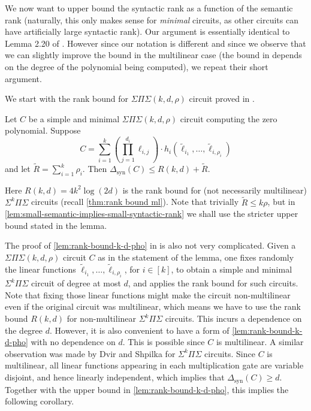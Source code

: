 \documentclass[12pt]{article}
\newcommand{\SumProdSum}{\Sigma \Pi \Sigma}
\newcommand{\Sps}[1]{\Sigma^{#1} \Pi\Sigma}
\newcommand{\ranksyn}{\Delta_{\text{syn}}}
\begin{document}
		
	
	We now want to upper bound the syntactic rank as a function of the semantic rank (naturally, this only makes sense for \emph{minimal} circuits, as other circuits can have artificially large syntactic rank). Our argument is essentially identical to Lemma 2.20 of \cite{KarninShpilka09}. However since our notation is different and since we observe that we can slightly improve the bound in the multilinear case (the bound in \cite{KarninShpilka09} depends on the degree of the polynomial being computed), we repeat their short argument.
	
	We start with the rank bound for $\SumProdSum(k,d,\rho)$ circuit proved in \cite{KarninShpilka08}.
	
	\begin{lemma}
		\label{lem:rank-bound-k-d-pho}
		Let $C$ be a simple and minimal $\SumProdSum(k,d,\rho)$ circuit computing the zero polynomial. Suppose
		\[
		C = \sum_{i=1}^k \left( \prod_{j=1}^{d_i} \ell_{i,j} \right) \cdot h_i (\tilde{\ell}_{i_1}, \ldots, \tilde{\ell}_{i,\rho_i})
		\]
		and let $\tilde{R} = \sum_{i=1}^k \rho_i$.
		Then $\ranksyn(C) \le R(k,d) + \tilde{R}$.
	\end{lemma}
	
	Here $R(k,d) = 4k^2 \log (2d)$ is the rank bound for (not necessarily multilinear) $\Sps{k}$ circuits (recall \autoref{thm:rank bound ml}). Note that trivially $\tilde{R} \le k \rho$, but in \autoref{lem:small-semantic-implies-small-syntactic-rank} we shall use the stricter upper bound stated in the lemma. 
	
	
	The proof of \autoref{lem:rank-bound-k-d-pho} in \cite{KarninShpilka08} is also not very complicated. Given a $\SumProdSum(k,d,\rho)$  circuit $C$ as in the statement of the lemma, one fixes randomly the linear functions $\tilde{\ell}_{i_1}, \ldots, \tilde{\ell}_{i,\rho_i}$, for $i \in [k]$, to obtain a simple and minimal $\Sps{k}$ circuit of degree at most $d$, and applies the rank bound for such circuits. Note that fixing those linear functions might make the circuit non-multilinear even if the original circuit was multilinear, which means we have to use the rank bound $R(k,d)$ for non-multilinear $\Sps{k}$ circuits. This incurs a dependence on the degree $d$. 	However, it is also convenient to have a form of \autoref{lem:rank-bound-k-d-pho} with no dependence on $d$. This is possible since $C$ is multilinear. A similar observation was made by Dvir and Shpilka \cite{DS07} for $\Sps{k}$ circuits. Since $C$ is multilinear,  all linear functions appearing in each multiplication gate are variable disjoint, and hence linearly independent, which implies that $\ranksyn(C) \ge d$. Together with the upper bound in \autoref{lem:rank-bound-k-d-pho}, this implies the following corollary.
	
\end{document}
